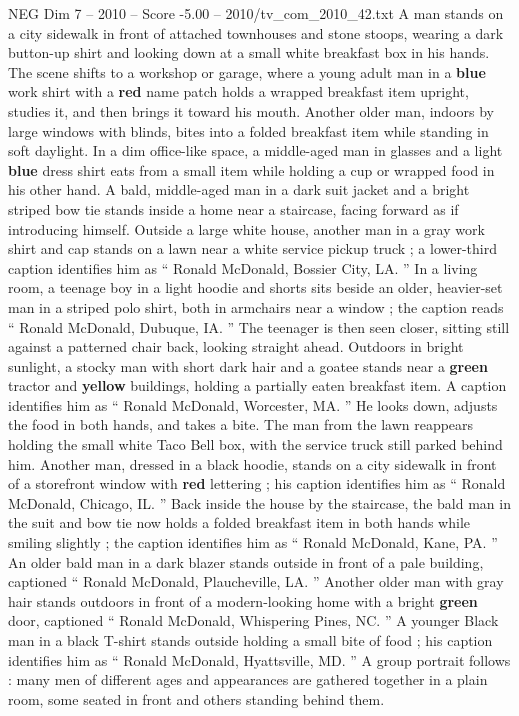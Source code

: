 \begin{textsample}{NEG Dim 7 – 2010 – Score -5.00 – 2010/tv\_com\_2010\_42.txt}  \label{ex:f7_neg_042}
A man stands on a city sidewalk in front of attached townhouses and stone stoops, wearing a dark button-up shirt and looking down at a small white breakfast box in his hands.
The scene shifts to a workshop or garage, where a young adult man in a \textbf{blue} work shirt with a \textbf{red} name patch holds a wrapped breakfast item upright, studies it, and then brings it toward his mouth.
Another older man, indoors by large windows with blinds, bites into a folded breakfast item while standing in soft daylight.
In a dim office-like space, a middle-aged man in glasses and a light \textbf{blue} dress shirt eats from a small item while holding a cup or wrapped food in his other hand.
A bald, middle-aged man in a dark suit jacket and a bright striped bow tie stands inside a home near a staircase, facing forward as if introducing himself.
Outside a large white house, another man in a gray work shirt and cap stands on a lawn near a white service pickup truck ; a lower-third caption identifies him as “ Ronald McDonald, Bossier City, LA. ” In a living room, a teenage boy in a light hoodie and shorts sits beside an older, heavier-set man in a striped polo shirt, both in armchairs near a window ; the caption reads “ Ronald McDonald, Dubuque, IA. ” The teenager is then seen closer, sitting still against a patterned chair back, looking straight ahead.
Outdoors in bright sunlight, a stocky man with short dark hair and a goatee stands near a \textbf{green} tractor and \textbf{yellow} buildings, holding a partially eaten breakfast item.
A caption identifies him as “ Ronald McDonald, Worcester, MA. ” He looks down, adjusts the food in both hands, and takes a bite.
The man from the lawn reappears holding the small white Taco Bell box, with the service truck still parked behind him.
Another man, dressed in a black hoodie, stands on a city sidewalk in front of a storefront window with \textbf{red} lettering ; his caption identifies him as “ Ronald McDonald, Chicago, IL. ” Back inside the house by the staircase, the bald man in the suit and bow tie now holds a folded breakfast item in both hands while smiling slightly ; the caption identifies him as “ Ronald McDonald, Kane, PA. ” An older bald man in a dark blazer stands outside in front of a pale building, captioned “ Ronald McDonald, Plaucheville, LA. ” Another older man with gray hair stands outdoors in front of a modern-looking home with a bright \textbf{green} door, captioned “ Ronald McDonald, Whispering Pines, NC. ” A younger Black man in a black T-shirt stands outside holding a small bite of food ; his caption identifies him as “ Ronald McDonald, Hyattsville, MD. ” A group portrait follows : many men of different ages and appearances are gathered together in a plain room, some seated in front and others standing behind them.

\end{textsample}
